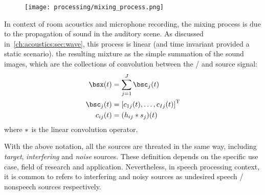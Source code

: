 \begin{figure}[t]
    \begin{fullwidthfig}
        \texttt{[image: processing/mixing\_process.png]}
    \end{fullwidthfig}

    \vspace{-\baselineskip}\vspace{-\baselineskip}
    \label{fig:processing:mixing}
\end{figure}

In context of room acoustics and microphone recording, the mixing process is due to the propagation of sound in the auditory scene.
As discussed in~\cref{ch:acoustics:sec:wave}, this process is linear (and time invariant provided a static scenario).
 the resulting mixture as the simple summation of the sound images,
which are the collections of convolution between the \RIRs/ and source signal:
\begin{align}
    \mics(t)         &= \sum_{\idxSrc=1}^{\numSrcs} \imgs_\idxSrc(t)\\
    \imgs_\idxSrc(t) &= \ktranspose{\klist{\img_{1\idxSrc}(t), \dots, \img_{\numMics\idxSrc}(t)}}\\
    \img_{\idxMic\idxSrc}(t) &=  \kparen{h_{\idxMic\idxSrc} \conv \src_\idxSrc} (t)
\end{align}
where $\ast$ is the linear convolution operator.

With the above notation, all the sources are threated in the same way, including \textit{target}, \textit{interfering} and \textit{noise} sources.
These definition depends on the specific use case, field of research and application.
Nevertheless, in speech processing context, it is common to refers to interfering and noisy sources as undesired speech \vs/ nonspeech sources respectively.

